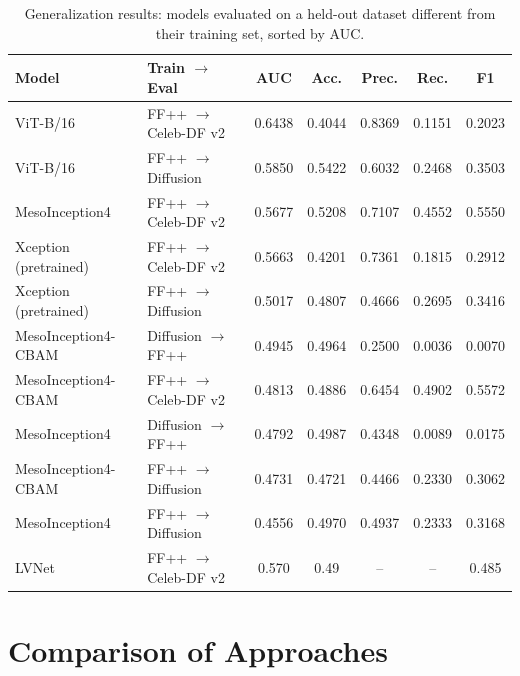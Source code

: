 \documentclass[conference]{IEEEtran}
\begin{document}
\begin{table}[t]
\centering
\caption{Generalization results: models evaluated on a held-out dataset different from their training set, sorted by AUC.}
\label{tab:ablation_gen}
\begin{tabular}{llccccc}
\toprule
\textbf{Model} & \textbf{Train} $\to$ \textbf{Eval} & \textbf{AUC} & \textbf{Acc.} & \textbf{Prec.} & \textbf{Rec.} & \textbf{F1} \\
\midrule
ViT-B/16               & FF++ $\to$ Celeb-DF v2     & 0.6438 & 0.4044 & 0.8369 & 0.1151 & 0.2023 \\
ViT-B/16               & FF++ $\to$ Diffusion       & 0.5850 & 0.5422 & 0.6032 & 0.2468 & 0.3503 \\
MesoInception4         & FF++ $\to$ Celeb-DF v2     & 0.5677 & 0.5208 & 0.7107 & 0.4552 & 0.5550 \\
Xception (pretrained)  & FF++ $\to$ Celeb-DF v2     & 0.5663 & 0.4201 & 0.7361 & 0.1815 & 0.2912 \\
Xception (pretrained)  & FF++ $\to$ Diffusion       & 0.5017 & 0.4807 & 0.4666 & 0.2695 & 0.3416 \\
MesoInception4-CBAM    & Diffusion $\to$ FF++       & 0.4945 & 0.4964 & 0.2500 & 0.0036 & 0.0070 \\
MesoInception4-CBAM    & FF++ $\to$ Celeb-DF v2     & 0.4813 & 0.4886 & 0.6454 & 0.4902 & 0.5572 \\
MesoInception4         & Diffusion $\to$ FF++       & 0.4792 & 0.4987 & 0.4348 & 0.0089 & 0.0175 \\
MesoInception4-CBAM    & FF++ $\to$ Diffusion       & 0.4731 & 0.4721 & 0.4466 & 0.2330 & 0.3062 \\
MesoInception4         & FF++ $\to$ Diffusion       & 0.4556 & 0.4970 & 0.4937 & 0.2333 & 0.3168 \\
LVNet                 & FF++ $\to$ Celeb-DF v2      & 0.570 & 0.49    & --     & --     & 0.485  \\
\bottomrule
\end{tabular}
\end{table}
\section{Comparison of Approaches}
\label{sec:comparison}
\end{document}
